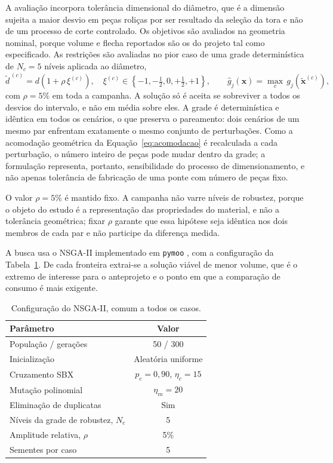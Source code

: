 A avaliação incorpora tolerância dimensional do diâmetro, que é a dimensão sujeita a maior desvio em peças roliças por ser resultado da seleção da tora e não de um processo de corte controlado. Os objetivos são avaliados na geometria nominal, porque volume e flecha reportados são os do projeto tal como especificado. As restrições são avaliadas no pior caso de uma grade determinística de $N_c=5$ níveis aplicada ao diâmetro,
\begin{equation}
\widetilde d^{\,(c)}=d\left(1+\rho\,\xi^{(c)}\right),\quad
\xi^{(c)}\in\left\{-1,-\tfrac{1}{2},0,+\tfrac{1}{2},+1\right\},\qquad
\widehat g_j(\mathbf{x})=\max_{c}\,g_j\!\left(\widetilde{\mathbf{x}}^{(c)}\right),
\label{eq:agregacao_robusta}
\end{equation}
com $\rho=5\%$ em toda a campanha. A solução só é aceita se sobreviver a todos os desvios do intervalo, e não em média sobre eles. A grade é determinística e idêntica em todos os cenários, o que preserva o pareamento: dois cenários de um mesmo par enfrentam exatamente o mesmo conjunto de perturbações. Como a acomodação geométrica da Equação~\eqref{eq:acomodacao} é recalculada a cada perturbação, o número inteiro de peças pode mudar dentro da grade; a formulação representa, portanto, sensibilidade do processo de dimensionamento, e não apenas tolerância de fabricação de uma ponte com número de peças fixo.

O valor $\rho=5\%$ é mantido fixo. A campanha não varre níveis de robustez, porque o objeto do estudo é a representação das propriedades do material, e não a tolerância geométrica; fixar $\rho$ garante que essa hipótese seja idêntica nos dois membros de cada par e não participe da diferença medida.

A busca usa o NSGA-II \parencite{Deb2002} implementado em \texttt{pymoo} \parencite{blank2020}, com a configuração da Tabela~\ref{tab:otimizacao}. De cada fronteira extrai-se a solução viável de menor volume, que é o extremo de interesse para o anteprojeto e o ponto em que a comparação de consumo é mais exigente.

\begin{table}[!ht]
\centering
\caption{Configuração do NSGA-II, comum a todos os casos.}
\label{tab:otimizacao}
\footnotesize
\begin{tabular}{lc}
\toprule
Parâmetro & Valor \\
\midrule
População / gerações & 50 / 300 \\
Inicialização & Aleatória uniforme \\
Cruzamento SBX & $p_c=0{,}90$, $\eta_c=15$ \\
Mutação polinomial & $\eta_m=20$ \\
Eliminação de duplicatas & Sim \\
Níveis da grade de robustez, $N_c$ & 5 \\
Amplitude relativa, $\rho$ & 5\% \\
Sementes por caso & 5 \\
\bottomrule
\end{tabular}
\end{table}

